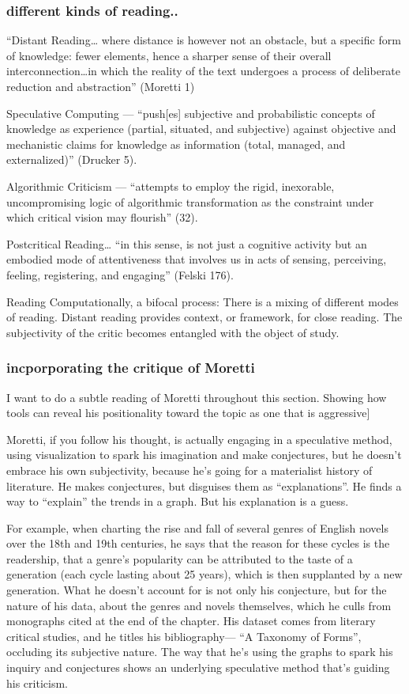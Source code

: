 \documentclass[11pt]{article}
\begin{document}
\subsubsection{different kinds of reading..}
\label{sec:org57dd6bc}
“Distant Reading… where distance is however not an obstacle, but a
specific form of knowledge: fewer elements, hence a sharper sense of
their overall interconnection\ldots{}in which the reality of the text
undergoes a process of deliberate reduction and abstraction”
(Moretti 1)

Speculative Computing --- “push[es] subjective and probabilistic
concepts of knowledge as experience (partial, situated, and
subjective) against objective and mechanistic claims for knowledge as
information (total, managed, and externalized)” (Drucker 5).

Algorithmic Criticism --- “attempts to employ the rigid, inexorable,
uncompromising logic of algorithmic transformation as the constraint
under which critical vision may flourish” (32).  

Postcritical Reading…  “in this sense, is not just a cognitive
activity but an embodied mode of attentiveness that involves us in
acts of sensing, perceiving, feeling, registering, and engaging”
(Felski 176).  

Reading Computationally, a bifocal process: There is a mixing of
different modes of reading. Distant reading provides context, or
framework, for close reading. The subjectivity of the critic becomes
entangled with the object of study.
\subsubsection{incporporating the critique of Moretti}
\label{sec:org74c06f5}
I want to do a subtle reading of Moretti throughout this
section. Showing how tools can reveal his positionality toward the
topic as one that is aggressive]

Moretti, if you follow his thought, is actually engaging in a
speculative method, using visualization to spark his imagination and
make conjectures, but he doesn’t embrace his own subjectivity, because
he’s going for a materialist history of literature. He makes
conjectures, but disguises them as “explanations”. He finds a way to
“explain” the trends in a graph. But his explanation is a guess.

For example, when charting the rise and fall of several genres of
English novels over the 18th and 19th centuries, he says that the
reason for these cycles is the readership, that a genre’s popularity
can be attributed to the taste of a generation (each cycle lasting
about 25 years), which is then supplanted by a new generation. What he
doesn’t account for is not only his conjecture, but for the nature of
his data, about the genres and novels themselves, which he culls from
monographs cited at the end of the chapter. His dataset comes from
literary critical studies, and he titles his bibliography--- “A
Taxonomy of Forms”, occluding its subjective nature. The way that he’s
using the graphs to spark his inquiry and conjectures shows an
underlying speculative method that’s guiding his criticism.
\end{document}
